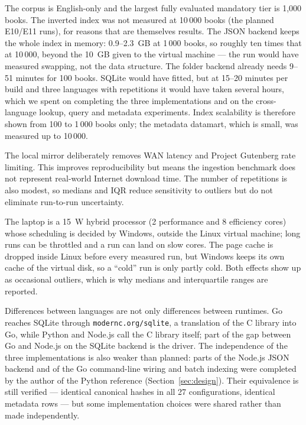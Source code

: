 \documentclass[12pt,a4paper]{article}
\begin{document}
	The corpus is English-only and the largest fully evaluated mandatory tier is 1,000 books.
	The inverted index was not measured at 10\,000 books (the planned E10/E11 runs), for
	reasons that are themselves results. The JSON backend keeps the whole index in memory:
	0.9--2.3~GB at 1\,000 books, so roughly ten times that at 10\,000, beyond the 10~GB given
	to the virtual machine --- the run would have measured swapping, not the data structure.
	The folder backend already needs 9--51 minutes for 100 books. SQLite would have fitted,
	but at 15--20 minutes per build and three languages with repetitions it would have taken
	several hours, which we spent on completing the three implementations and on the
	cross-language lookup, query and metadata experiments. Index scalability is therefore
	shown from 100 to 1\,000 books only; the metadata datamart, which is small, was measured
	up to 10\,000.
	
	The local mirror deliberately removes WAN latency and Project Gutenberg rate limiting.
	This improves reproducibility but means the ingestion benchmark does not represent
	real-world Internet download time. The number of repetitions is also modest, so medians
	and IQR reduce sensitivity to outliers but do not eliminate run-to-run uncertainty.

	The laptop is a 15~W hybrid processor (2 performance and 8 efficiency cores) whose
	scheduling is decided by Windows, outside the Linux virtual machine; long runs can be
	throttled and a run can land on slow cores. The page cache is dropped inside Linux before
	every measured run, but Windows keeps its own cache of the virtual disk, so a ``cold''
	run is only partly cold. Both effects show up as occasional outliers, which is why medians
	and interquartile ranges are reported.

	Differences between languages are not only differences between runtimes. Go reaches
	SQLite through \texttt{modernc.org/sqlite}, a translation of the C library into Go, while
	Python and Node.js call the C library itself; part of the gap between Go and Node.js on
	the SQLite backend is the driver. The independence of the three implementations is also
	weaker than planned: parts of the Node.js JSON backend and of the Go command-line wiring
	and batch indexing were completed by the author of the Python reference
	(Section~\ref{sec:design}). Their equivalence is still verified --- identical canonical
	hashes in all 27 configurations, identical metadata rows --- but some implementation
	choices were shared rather than made independently.
	
\end{document}
